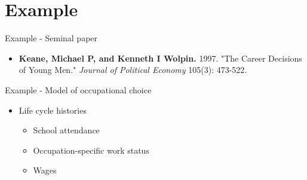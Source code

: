 \section{Example}
\begin{frame}{Example - Seminal paper}
\begin{itemize}
\item \textbf{Keane, Michael P, and Kenneth I Wolpin.} 1997. "The Career Decisions of Young Men." \textit{Journal of Political Economy} 105(3): 473-522.
\end{itemize}
\end{frame}
\begin{frame}{Example - Model of occupational choice}

\begin{itemize}\setlength\itemsep{1em}
\item Life cycle histories \medskip
\begin{itemize}\setlength\itemsep{1em}
\item School attendance
\item Occupation-specific work status
\item Wages
\end{itemize}
\end{itemize}
\end{frame}

